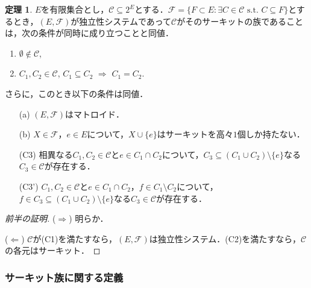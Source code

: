 \documentclass[xelatex,ja=standard,a4paper,14pt,everyparhook=compat]{bxjsarticle}
\theoremstyle{definition}
\newtheorem{theorem}{定理}[subsection]
\begin{document}
\begin{theorem}
    $E$を有限集合とし，$\mathcal{C} \subseteq 2^E$とする．$\mathcal{F} = \{F \subset E : \text{$\exists C \in \mathcal{C}$ s.t. $C \subseteq F$}\}$とするとき，$(E, \mathcal{F})$が独立性システムであって$\mathcal{C}$がそのサーキットの族であることは，次の条件が同時に成り立つことと同値． \begin{enumerate}[label=(C\arabic*)]
        \item $\emptyset \notin \mathcal{C}$,
        \item $C_1, C_2 \in \mathcal{C}$, $C_1 \subseteq C_2$ $\Longrightarrow$ $C_1 = C_2$.
    \end{enumerate}
    さらに，このとき以下の条件は同値． \begin{enumerate}
        \item[(a)] $(E, \mathcal{F})$はマトロイド．
        \item[(b)] $X \in \mathcal{F}$，$e \in E$について，$X \cup \{e\}$はサーキットを高々$1$個しか持たない．
        \item[(C3)] 相異なる$C_1, C_2 \in \mathcal{C}$と$e \in C_1 \cap C_2$について，$C_3 \subseteq (C_1 \cup C_2) \setminus \{e\}$なる$C_3 \in \mathcal{C}$が存在する．
        \item[(C3')] $C_1, C_2 \in \mathcal{C}$と$e \in C_1 \cap C_2$，$f \in C_1 \setminus C_2$について，$f \in C_3 \subseteq (C_1 \cup C_2) \setminus \{e\}$なる$C_3 \in \mathcal{C}$が存在する．
    \end{enumerate}
\end{theorem}
\begin{proof}[\textup{前半の証明}]
    ($\Longrightarrow$) 明らか．

    ($\Longleftarrow$) $\mathcal{C}$が(C1)を満たすなら，$(E, \mathcal{F})$は独立性システム．(C2)を満たすなら，$\mathcal{C}$の各元はサーキット．
\end{proof}

\subsubsection*{サーキット族に関する定義}
\end{document}
